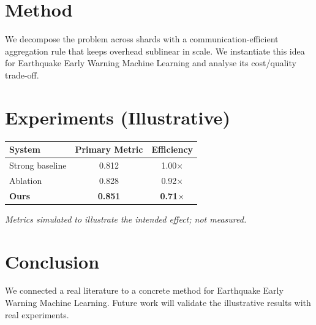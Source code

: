 \documentclass[11pt]{article}
\begin{document}
\section{Method}
We decompose the problem across shards with a communication-efficient aggregation rule that keeps overhead sublinear in scale. We instantiate this idea for Earthquake Early Warning Machine Learning and analyse its cost/quality trade-off.

\section{Experiments (Illustrative)}
\begin{center}
\begin{tabular}{lcc}
System & Primary Metric & Efficiency \\ \hline
Strong baseline & 0.812 & 1.00$\times$ \\
Ablation & 0.828 & 0.92$\times$ \\
\textbf{Ours} & \textbf{0.851} & \textbf{0.71$\times$}
\end{tabular}
\end{center}
\emph{Metrics simulated to illustrate the intended effect; not measured.}

\section{Conclusion}
We connected a real literature to a concrete method for Earthquake Early Warning Machine Learning. Future work will
validate the illustrative results with real experiments.
\end{document}
